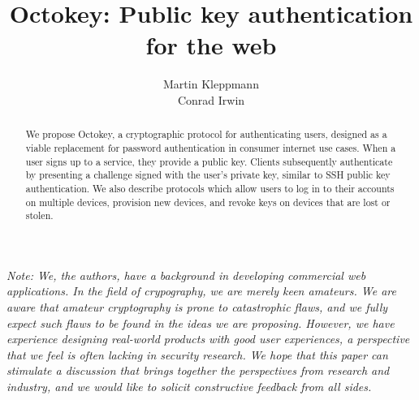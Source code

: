 \documentclass{acm_proc_article-sp}
\begin{document}
\title{Octokey: Public key authentication for the web}
\author{
    \alignauthor Martin Kleppmann \\ 
    \alignauthor Conrad Irwin \\ }
\maketitle

\begin{abstract}
We propose Octokey, a cryptographic protocol for authenticating users, designed as a viable
replacement for password authentication in consumer internet use cases. When a user signs up to a
service, they provide a public key. Clients subsequently authenticate by presenting a challenge
signed with the user's private key, similar to SSH public key authentication. We also describe
protocols which allow users to log in to their accounts on multiple devices, provision new devices,
and revoke keys on devices that are lost or stolen.
\end{abstract}

\bigskip

\emph{Note: We, the authors, have a background in developing commercial web applications. In the
field of crypography, we are merely keen amateurs. We are aware that amateur cryptography is prone
to catastrophic flaws, and we fully expect such flaws to be found in the ideas we are proposing.
However, we have experience designing real-world products with good user experiences, a perspective
that we feel is often lacking in security research. We hope that this paper can stimulate a
discussion that brings together the perspectives from research and industry, and we would like to
solicit constructive feedback from all sides.}







{}

\end{document}
